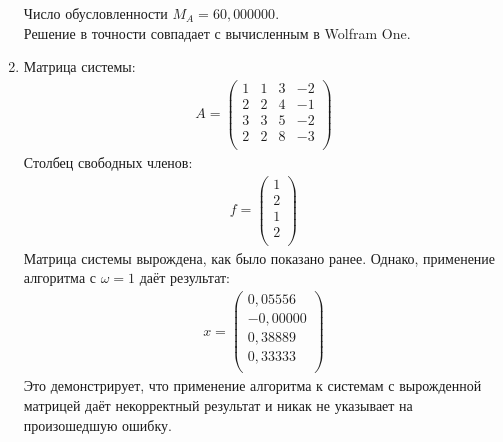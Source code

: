 \documentclass[a4paper,12pt,titlepage,finall]{article}
\begin{document}
\begin{enumerate}
Число обусловленности $M_A = 60,000000$.\\
Решение в точности совпадает с вычисленным в Wolfram One.
\item
Матрица системы:
\begin{align*}
A = \begin{pmatrix}
1&     1&     3&    -2 \\
   2&     2&     4&    -1 \\
   3&     3&     5&    -2 \\
   2&     2&     8&    -3 \\
\end{pmatrix}
\end{align*}
Столбец свободных членов:
\begin{align*}
f = \begin{pmatrix}
1 \\
2 \\
1 \\
2 \\
\end{pmatrix}
\end{align*}
Матрица системы вырождена, как было показано ранее. Однако, применение алгоритма с $\omega = 1$ даёт результат:
\begin{align*}
x = \begin{pmatrix}
0,05556 \\
  -0,00000\\ 
   0,38889 \\
   0,33333 \\
\end{pmatrix}
\end{align*}
Это демонстрирует, что применение алгоритма к системам с вырожденной матрицей даёт некорректный результат и никак не указывает на произошедшую ошибку.


\end{enumerate}
\end{document}
